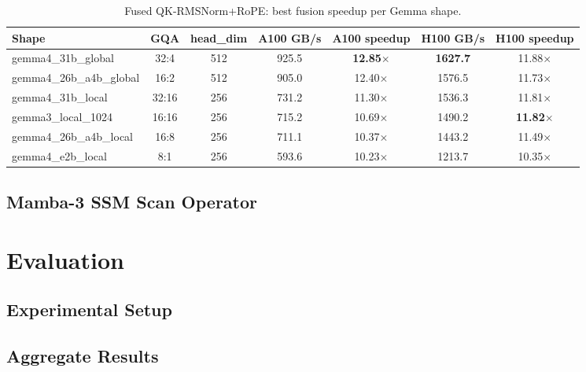 \documentclass{article}
\begin{document}
\begin{table}[t]
\centering
\caption{Fused QK-RMSNorm+RoPE: best fusion speedup per Gemma shape.}
\label{tab:fusion-speedup}
\small
\begin{tabular}{@{}lcccccc@{}}
\toprule
Shape & GQA & head\_dim & A100 GB/s & A100 speedup & H100 GB/s & H100 speedup \\
\midrule
gemma4\_31b\_global & 32:4 & 512 & 925.5 & \textbf{12.85$\times$} & \textbf{1627.7} & 11.88$\times$ \\
gemma4\_26b\_a4b\_global & 16:2 & 512 & 905.0 & 12.40$\times$ & 1576.5 & 11.73$\times$ \\
gemma4\_31b\_local & 32:16 & 256 & 731.2 & 11.30$\times$ & 1536.3 & 11.81$\times$ \\
gemma3\_local\_1024 & 16:16 & 256 & 715.2 & 10.69$\times$ & 1490.2 & \textbf{11.82$\times$} \\
gemma4\_26b\_a4b\_local & 16:8 & 256 & 711.1 & 10.37$\times$ & 1443.2 & 11.49$\times$ \\
gemma4\_e2b\_local & 8:1 & 256 & 593.6 & 10.23$\times$ & 1213.7 & 10.35$\times$ \\
\bottomrule
\end{tabular}
\end{table}

\subsection{Mamba-3 SSM Scan Operator}
\label{sec:ssm-scan}


\section{Evaluation}
\label{sec:eval}

\subsection{Experimental Setup}
\label{sec:setup}

\subsection{Aggregate Results}
\label{sec:aggregate}
\end{document}
